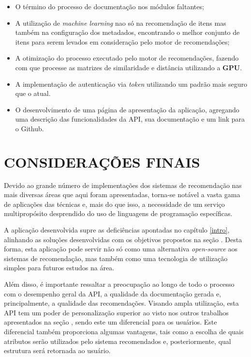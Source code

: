 \documentclass[12pt, openright, oneside, a4paper, brazil]{abntex2}
\begin{document}
\begin{itemize}
	\item O término do processo de documentação nos módulos faltantes;

	\item A utilização de \textit{machine learning} nao só na recomendação de itens mas também na configuração dos metadados, encontrando o melhor conjunto de itens para serem levados em consideração pelo motor de recomendações;

	\item A otimização do processo executado pelo motor de recomendações, fazendo com que processe as matrizes de similaridade e distância utilizando a \textbf{GPU}.

	\item A implementação de autenticação via \textit{token} utilizando um padrão mais seguro que o atual.

	\item O desenvolvimento de uma página de apresentação da aplicação, agregando uma descrição das funcionalidades da API, sua documentação e um link para o Github.
\end{itemize}

\chapter{CONSIDERAÇÕES FINAIS}

Devido ao grande número de implementações dos sistemas de recomendação nas mais diversas áreas que aqui foram apresentadas, torna-se notável a vasta gama de aplicações das técnicas e, mais do que isso, a necessidade de um serviço multipropósito desprendido do uso de linguagens de programação específicas.

A aplicação desenvolvida supre as deficiências apontadas no capítulo \ref{intro}, alinhando as soluções desenvolvidas com os objetivos propostos na seção . Desta forma, esta aplicação pode servir não só como uma alternativa \textit{open-source} aos sistemas de recomendação, mas também como uma tecnologia de utilização simples para futuros estudos na área.

Além disso, é importante ressaltar a preocupação ao longo de todo o processo com o desempenho geral da API, a qualidade da documentação gerada e, principalmente, a qualidade das recomendações. Visando ampla utilização, esta API tem um poder de personalização superior ao visto nos outros trabalhos apresentados na seção , sendo este um diferencial para os usuários. Este diferencial também proporciona algumas vantagens, tais como a escolha de quais atributos serão utilizados pelo sistema recomendados e, posteriormente, qual estrutura será retornada ao usuário.
\end{document}
